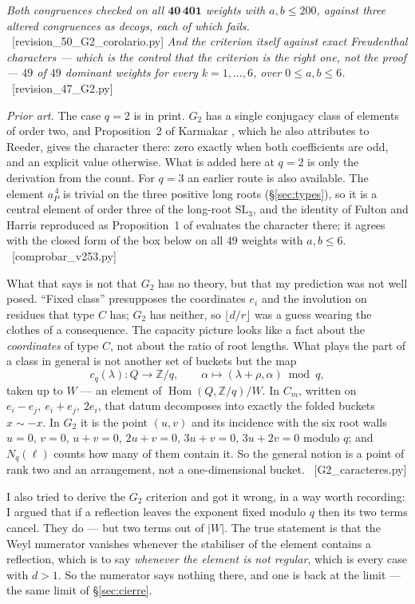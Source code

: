 \documentclass[11pt,a4paper]{article}
\theoremstyle{definition}
\newcommand{\SL}{\mathrm{SL}}
\newcommand{\ZZ}{\mathbb{Z}}
\newcommand{\ver}[1]{\unskip\penalty0\ \textcolor{azul}{\small\textsf{[#1]}}}
\begin{document}
\noindent \emph{Both congruences checked on all $\mathbf{40\,401}$ weights with $a,b\le200$, against
three altered congruences as decoys, each of which fails.} \ver{revision\_50\_G2\_corolario.py}
\emph{And the criterion itself against exact Freudenthal characters --- which is the control that
the criterion is the right one, not the proof --- $49$ of $49$ dominant weights for every
$k=1,\dots,6$, over $0\le a,b\le6$.} \ver{revision\_47\_G2.py}

\noindent \emph{Prior art.} The case $q=2$ is in print. $G_2$ has a single conjugacy class of
elements of order two, and Proposition~2 of Karmakar \cite{Kar24}, which he also attributes to
Reeder, gives the character there: zero exactly when both coefficients are odd, and an explicit
value otherwise. What is added here at $q=2$ is only the derivation from the count. For $q=3$ an
earlier route is also available. The element $a_P^{\,4}$ is trivial on the three positive long
roots (\S\ref{sec:types}), so it is a central element of order three of the long-root $\SL_3$, and
the identity of Fulton and Harris reproduced as Proposition~1 of \cite{Kar24} evaluates the
character there; it agrees with the closed form of the box below on all $49$ weights with
$a,b\le6$. \ver{comprobar\_v253.py}

\noindent What that says is not that $G_2$ has no theory, but that my prediction was not well posed.
``Fixed class'' presupposes the coordinates $e_i$ and the involution on residues that type $C$ has;
$G_2$ has neither, so $\lfloor d/r\rfloor$ was a guess wearing the clothes of a consequence. The
capacity picture looks like a fact about the \emph{coordinates} of type $C$, not about the ratio of
root lengths. What plays the part of a class in general is not another set of buckets but the map
\[
c_q(\lambda):Q\longrightarrow\ZZ/q,\qquad \alpha\longmapsto(\lambda+\rho,\alpha)\bmod q,
\]
taken up to $W$ --- an element of $\operatorname{Hom}(Q,\ZZ/q)/W$. In $C_m$, written on
$e_i-e_j,\ e_i+e_j,\ 2e_i$, that datum decomposes into exactly the folded buckets $x\sim-x$. In
$G_2$ it is the point $(u,v)$ and its incidence with the six root walls $u=0$, $v=0$, $u+v=0$,
$2u+v=0$, $3u+v=0$, $3u+2v=0$ modulo $q$; and $N_q(\ell)$ counts how many of them contain it. So
the general notion is a point of rank two and an arrangement, not a one-dimensional bucket.
\ver{G2\_caracteres.py}

I also tried to derive the $G_2$ criterion and got it wrong, in a way worth recording: I argued that
if a reflection leaves the exponent fixed modulo $q$ then its two terms cancel. They do --- but two
terms out of $|W|$. The true statement is that the Weyl numerator vanishes whenever the stabiliser
of the element contains a reflection, which is to say \emph{whenever the element is not regular},
which is every case with $d>1$. So the numerator says nothing there, and one is back at the limit
--- the same limit of \S\ref{sec:cierre}.
\end{document}

